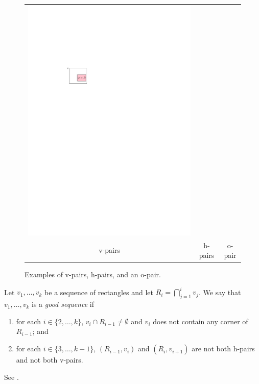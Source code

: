 \documentclass[lotsofwhite]{patmorin}
\begin{document}
\begin{figure}
\begin{tabular}{ccc}
   \includegraphics{figs/hvo-3} \\
   v-pairs & h-pairs & o-pair
   \end{tabular}
   \caption{Examples of v-pairs, h-pairs, and an o-pair.}
\end{figure}

Let $v_1,\ldots,v_k$ be a sequence of rectangles and let
$R_i=\bigcap_{j=1}^i v_j$.  We say that $v_1,\ldots,v_k$ is a \emph{good
sequence} if
\begin{enumerate}
  \item for each $i\in\{2,\ldots,k\}$, $v_i\cap R_{i-1}\neq \emptyset$
        and $v_i$ does not contain any corner of $R_{i-1}$; and
  \item for each $i\in\{3,\ldots,k-1\}$, $(R_{i-1},v_i)$ and
        $(R_i,v_{i+1})$ are not both h-pairs and not both v-pairs.
\end{enumerate}
See .
\end{document}

